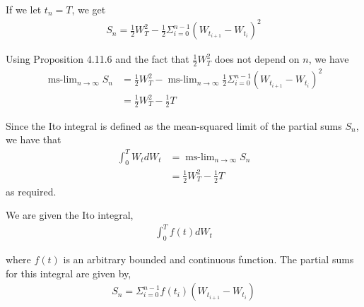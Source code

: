 \documentclass[12pt]{article}
\newenvironment{problem}[2][Problem]{\begin{trivlist}
\item[\hskip \labelsep {\bfseries #1}\hskip \labelsep {\bfseries #2.}]}{\end{trivlist}}
\begin{document}
If we let $t_n = T$, we get
\begin{align*}
S_n = \frac{1}{2}W^2_T - \frac{1}{2} \Sigma_{i=0}^{n-1}(W_{t_{i+1}} - W_{t_i})^2
\end{align*}

Using Proposition 4.11.6 and the fact that $\frac{1}{2}W^2_T$ does not depend on $n$, we have
\begin{align*}
\operatorname{ms-\lim}_{n \to \infty} S_n &= \frac{1}{2}W^2_T - \operatorname{ms-\lim}_{n \to \infty} \frac{1}{2} \Sigma_{i=0}^{n-1}(W_{t_{i+1}} - W_{t_i})^2\\
&= \frac{1}{2}W^2_T - \frac{1}{2}T
\end{align*}

Since the Ito integral is defined as the mean-squared limit of the partial sums $S_n$, we have that
\begin{align*}
\int_0^T W_tdW_t &= \operatorname{ms-\lim}_{n \to \infty} S_n\\
&= \frac{1}{2}W^2_T - \frac{1}{2}T
\end{align*}
as required.

\begin{problem}{14}
\end{problem}

We are given the Ito integral,
\begin{align*}
\int_0^T f(t)dW_t
\end{align*}

where $f(t)$ is an arbitrary bounded and continuous function. The partial sums for this integral are given by,
\begin{align*}
S_n = \Sigma_{i = 0}^{n-1} f(t_i)(W_{t_{i+1}} - W_{t_i})
\end{align*}
\end{document}
